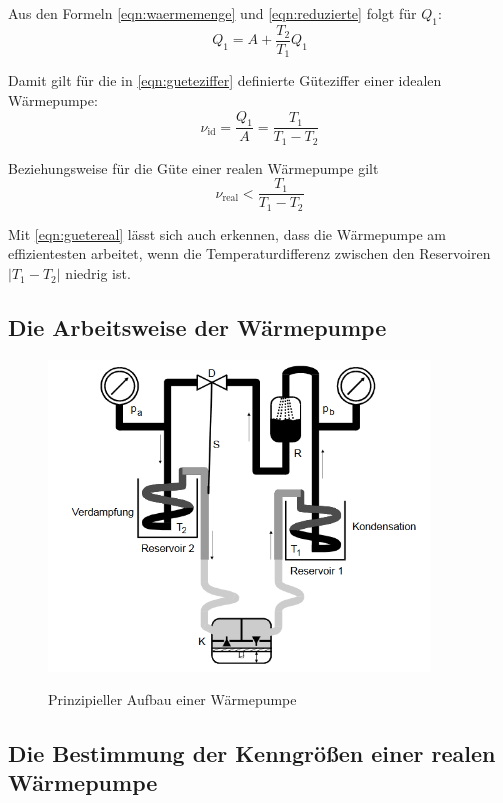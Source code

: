 Aus den Formeln \ref{eqn:waermemenge} und \ref{eqn:reduzierte} folgt für $Q_1$:
\begin{equation}
	Q_1 = A + \frac{T_2}{T_1} Q_1
	\label{eqn:q1}
\end{equation}

Damit gilt für die in \ref{eqn:gueteziffer} definierte Güteziffer einer idealen Wärmepumpe:
\begin{equation}
	\nu_\text{id} = \frac{Q_1}{A} = \frac{T_1}{T_1 - T_2}
	\label{eqn:gueteideal}
\end{equation}

Beziehungsweise für die Güte einer realen Wärmepumpe gilt
\begin{equation}
	\nu_\text{real} <
	\frac{T_1}{T_1 - T_2}
	\label{eqn:guetereal}
\end{equation}

Mit \ref{eqn:guetereal} lässt sich auch erkennen, dass die Wärmepumpe am effizientesten arbeitet,
wenn die Temperaturdifferenz zwischen den Reservoiren $\vert T_1 - T_2 \vert$ niedrig ist.

\subsection{Die Arbeitsweise der Wärmepumpe}

\begin{figure}[H]
	\centering
	\includegraphics[width=0.9\textwidth]{content/aufbau.jpg}
	\caption{Prinzipieller Aufbau einer W\"armepumpe}
	\cite{anleitung}
	\label{fig:aufbau}
\end{figure}

\subsection{Die Bestimmung der Kenngrößen einer realen
Wärmepumpe}


